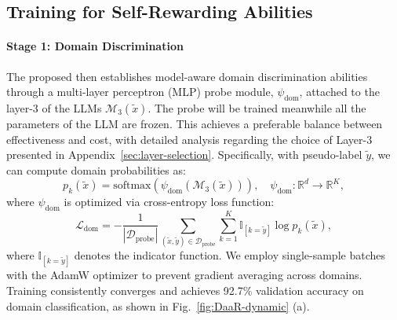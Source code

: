 
\subsection{Training for Self-Rewarding Abilities}

\paragraph{Stage 1: Domain Discrimination}
The proposed \ours then establishes model-aware domain discrimination abilities through a multi-layer perceptron (MLP) probe module, $\psi_{\text{dom}}$, attached to the layer-3 of the LLMs $\mathcal{M}_3(\tilde{x})$. 
The probe will be trained meanwhile all the parameters of the LLM are frozen.
This achieves a preferable balance between effectiveness and cost, with detailed analysis regarding the choice of Layer-3 presented in Appendix~\ref{sec:layer-selection}.
Specifically, with pseudo-label $\tilde{y}$, we can compute domain probabilities as:
\begin{equation}
p_k(\tilde{x}) = \text{softmax}\left(\psi_{\text{dom}}(\mathcal{M}_3(\tilde{x}))\right), \quad \psi_{\text{dom}}:\mathbb{R}^d\rightarrow\mathbb{R}^K,
\end{equation}
where $\psi_{\text{dom}}$ is optimized via cross-entropy loss function:
\begin{equation}
\mathcal{L}_{\text{dom}} = -\frac{1}{|\mathcal{D}_{\text{probe}}|}\sum_{(\tilde{x},\tilde{y})\in\mathcal{D}_{\text{probe}}} \sum_{k=1}^K \mathbb{I}_{[k=\tilde{y}]} \log p_k(\tilde{x}),
\end{equation}
where $\mathbb{I}_{[k=\tilde{y}]}$ denotes the indicator function. We employ single-sample batches with the AdamW optimizer to prevent gradient averaging across domains. Training consistently converges and achieves 92.7\% validation accuracy on domain classification, as shown in Fig.~\ref{fig:DaaR-dynamic} (a).

